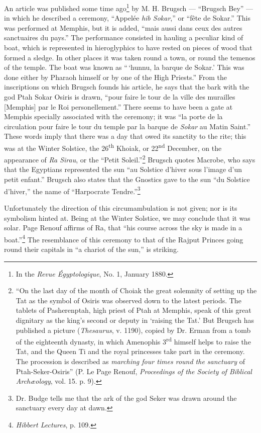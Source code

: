 \documentclass[a4paper, 11pt, oneside, polutonikogreek, english]{article}
\begin{document}
An article was published some time ago\footnote{In the \emph{Revue Égyptologique}, No. 1, January 1880.} by M. H. Brugsch --- ``Brugsch Bey'' --- in which he described a ceremony, ``Appelée \emph{hib Sokar},'' or ``fête de Sokar.'' This was performed at Memphis, but it is added, ``mais aussi dans ceux des autres sanctuaires du pays.'' The performance consisted in hauling a peculiar kind of boat, which is represented in hieroglyphics to have rested on pieces of wood that formed a sledge. In other places it was taken round a town, or round the temenos of the temple. The boat was known as ``\,`hunnu, la barque de Sokar.' This was done either by Pharaoh himself or by one of the High Priests.'' From the inscriptions on which Brugsch founds his article, he says that the bark with the god Ptah Sokar Osiris is drawn, ``pour faire le tour de la ville des murailles [Memphis] par le Roi personellement.'' There seems to have been a gate at Memphis specially associated with the ceremony; it was ``la porte de la circulation pour faire le tour du temple par la barque de \emph{Sokar} au Matin Saint.'' These words imply that there was a day that owed its sanctity to the rite; this was at the Winter Solstice, the 26\textsuperscript{th} Khoiak, or 22\textsuperscript{nd} December, on the appearance of \emph{Ra Sirau}, or the ``Petit Soleil.''\footnote{``On the last day of the month of Choiak the great solemnity of setting up the Tat as the symbol of Osiris was observed down to the latest periods. The tablets of Pasherenptah, high priest of Ptah at Memphis, speak of this great dignitary as the king's second or deputy in `raising the Tat.' But Brugsch has published a picture (\emph{Thesaurus}, v. 1190), copied by Dr. Erman from a tomb of the eighteenth dynasty, in which Amenophis 3\textsuperscript{rd} himself helps to raise the Tat, and the Queen Ti and the royal princesses take part in the ceremony. The procession is described as \emph{marching four times round the sanctuary} of Ptah-Seker-Osiris'' (P. Le Page Renouf, \emph{Proceedings of the Society of Biblical Archæology}, vol. 15. p. 9).} Brugsch quotes Macrobe, who says that the Egyptians represented the sun ``au Solstice d'hiver sous l'image d'un petit enfant.'' Brugsch also states that the Gnostics gave to the sun ``du Solstice d'hiver,'' the name of ``Harpocrate Tendre.''\footnote{Dr. Budge tells me that the ark of the god Seker was drawn around the sanctuary every day at dawn.}

Unfortunately the direction of this circumambulation is not given; nor is its symbolism hinted at. Being at the Winter Solstice, we may conclude that it was solar. Page Renouf affirms of Ra, that ``his course across the sky is made in a boat.''\footnote{\emph{Hibbert Lectures}, p. 109.} The resemblance of this ceremony to that of the Rajput Princes going round their capitals in ``a chariot of the sun,'' is striking.
\end{document}
